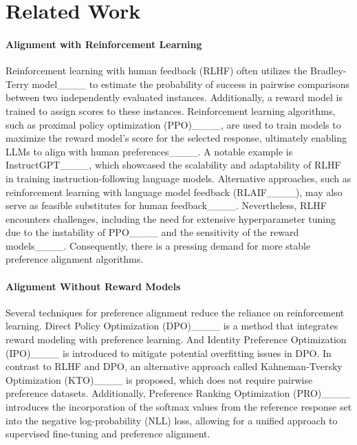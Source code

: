 \section{Related Work}
\paragraph{Alignment with Reinforcement Learning} 
Reinforcement learning with human feedback (RLHF) often utilizes the Bradley-Terry model____ to estimate the probability of success in pairwise comparisons between two independently evaluated instances. Additionally, a reward model is trained to assign scores to these instances. Reinforcement learning algorithms, such as proximal policy optimization (PPO)____, are used to train models to maximize the reward model's score for the selected response, ultimately enabling LLMs to align with human preferences____. A notable example is InstructGPT____, which showcased the scalability and adaptability of RLHF in training instruction-following language models. Alternative approaches, such as reinforcement learning with language model feedback (RLAIF____), may also serve as feasible substitutes for human feedback____. Nevertheless, RLHF encounters challenges, including the need for extensive hyperparameter tuning due to the instability of PPO____ and the sensitivity of the reward models____. Consequently, there is a pressing demand for more stable preference alignment algorithms.

\paragraph{Alignment Without Reward Models}
Several techniques for preference alignment reduce the reliance on reinforcement learning.
Direct Policy Optimization (DPO)____ is a method that integrates reward modeling with preference learning. And Identity Preference Optimization (IPO)____ is introduced to mitigate potential overfitting issues in DPO.
In contrast to RLHF and DPO, an alternative approach called Kahneman-Tversky Optimization (KTO)____ is proposed, which does not require pairwise preference datasets.
Additionally, Preference Ranking Optimization (PRO)____ introduces the incorporation of the softmax values from the reference response set into the negative log-probability (NLL) loss, allowing for a unified approach to supervised fine-tuning and preference alignment.

